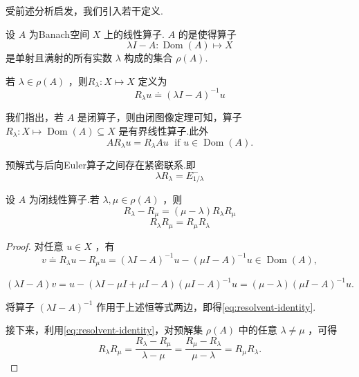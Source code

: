 受前述分析启发，我们引入若干定义.

\begin{definition}[预解集与预解算子]\label{def:resolvent}
设 $A$ 为Banach空间 $X$ 上的线性算子. $A$ 的是使得算子
\[
{\lambda I} - A : \operatorname{Dom}\left( A\right)  \mapsto  X
\]
是单射且满射的所有实数 $\lambda$ 构成的集合 $\rho \left( A\right)$.\par
若 $\lambda  \in  \rho \left( A\right)$ ，则${R}_{\lambda } : X \mapsto  X$ 定义为
\[
{R}_{\lambda }u \doteq  {\left( \lambda I - A\right) }^{-1}u
\]
\end{definition}
我们指出，若 $A$ 是闭算子，则由闭图像定理可知，算子 ${R}_{\lambda } : X \mapsto  \operatorname{Dom}\left( A\right)  \subseteq  X$ 是有界线性算子.此外
\[
A{R}_{\lambda }u = {R}_{\lambda }{Au}\;\text{ if }u \in  \operatorname{Dom}\left( A\right) .
\]

预解式与后向Euler算子之间存在紧密联系.即
\[
\lambda {R}_{\lambda } = {E}_{1/\lambda }^{ - }
\]

\begin{theorem}[预解式恒等式]\label{thm:resolvent-identities}
设 $A$ 为闭线性算子.若 $\lambda ,\mu  \in  \rho \left( A\right)$ ，则
\begin{equation}\tag{7.21}\label{eq:resolvent-identity}
{R}_{\lambda } - {R}_{\mu } = \left( {\mu  - \lambda }\right) {R}_{\lambda }{R}_{\mu }
\end{equation}
\vspace{-2.2 em}
\begin{equation}\tag{7.22}\label{eq:resolvent-commute}
{R}_{\lambda }{R}_{\mu } = {R}_{\mu }{R}_{\lambda }
\end{equation}
\end{theorem}
\begin{proof}
对任意 $u \in  X$ ，有
\[
v \doteq  {R}_{\lambda }u - {R}_{\mu }u = {\left( \lambda I - A\right) }^{-1}u - {\left( \mu I - A\right) }^{-1}u \in  \operatorname{Dom}\left( A\right) ,
\]

$\left( {{\lambda I} - A}\right) v = u - \left( {{\lambda I} - {\mu I} + {\mu I} - A}\right) {\left( \mu I - A\right) }^{-1}u = \left( {\mu  - \lambda }\right) {\left( \mu I - A\right) }^{-1}u.$\par
将算子 ${\left( \lambda I - A\right) }^{-1}$ 作用于上述恒等式两边，即得\eqref{eq:resolvent-identity}.

接下来，利用\eqref{eq:resolvent-identity}，对预解集 $\rho \left( A\right)$ 中的任意 $\lambda  \neq  \mu$ ，可得
\[
{R}_{\lambda }{R}_{\mu } = \frac{{R}_{\lambda } - {R}_{\mu }}{\lambda  - \mu } = \frac{{R}_{\mu } - {R}_{\lambda }}{\mu  - \lambda } = {R}_{\mu }{R}_{\lambda }.
\]
\end{proof}

